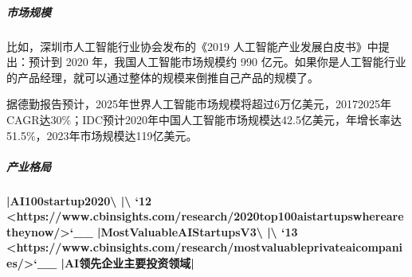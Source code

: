 \documentclass[letterpaper,10pt,english]{sphinxmanual}
\begin{document}
\subparagraph{市场规模}
\label{\detokenize{chapter_project/AI_industry_analysis:id5}}
比如，深圳市人工智能行业协会发布的《2019
人工智能产业发展白皮书》中提出：预计到 2020 年，我国人工智能市场规模约
990
亿元。如果你是人工智能行业的产品经理，就可以通过整体的规模来倒推自己产品的规模了。
%
\begin{footnote}[712]\sphinxAtStartFootnote
{}
%
\end{footnote}

据德勤报告预计，2025年世界人工智能市场规模将超过6万亿美元，2017\sphinxhyphen{}2025年CAGR达30\%；IDC预计2020年中国人工智能市场规模达42.5亿美元，年增长率达51.5\%，2023年市场规模达119亿美元。%
\begin{footnote}[713]\sphinxAtStartFootnote
{}
%
\end{footnote}


\subparagraph{产业格局}
\label{\detokenize{chapter_project/AI_industry_analysis:id6}}
\begin{center}\end{center} %
\begin{footnote}[714]\sphinxAtStartFootnote
{}
%
\end{footnote}
\begin{center}\end{center}
{\color{red}\bfseries{}|AI\sphinxhyphen{}100\sphinxhyphen{}startup\sphinxhyphen{}2020\textbackslash{} |\textbackslash{} `12 <https://www.cbinsights.com/research/2020\sphinxhyphen{}top\sphinxhyphen{}100\sphinxhyphen{}ai\sphinxhyphen{}startups\sphinxhyphen{}where\sphinxhyphen{}are\sphinxhyphen{}they\sphinxhyphen{}now/>`\_\_
|Most\sphinxhyphen{}Valuable\sphinxhyphen{}AI\sphinxhyphen{}Startups\sphinxhyphen{}V3\textbackslash{} |\textbackslash{} `13 <https://www.cbinsights.com/research/most\sphinxhyphen{}valuable\sphinxhyphen{}private\sphinxhyphen{}ai\sphinxhyphen{}companies/>`\_\_
|AI领先企业主要投资领域|} \begin{center}\end{center}
\end{document}
